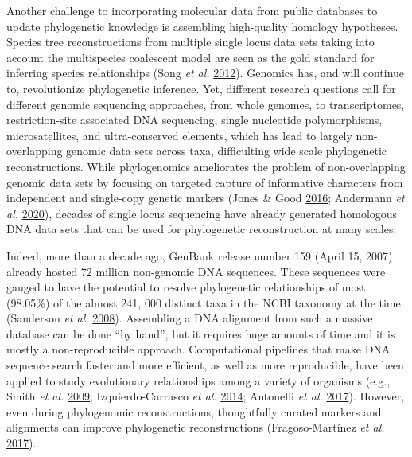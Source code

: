 \documentclass[]{article}
\begin{document}
Another challenge to incorporating molecular data from public databases to update phylogenetic knowledge is assembling high-quality homology hypotheses.
Species tree reconstructions from multiple single locus data sets taking into account the multispecies coalescent model are seen as the gold standard for inferring species relationships (Song \emph{et al.} \protect\hyperlink{ref-song2012resolving}{2012}).
Genomics has, and will continue to, revolutionize phylogenetic inference.
Yet, different research questions call for different genomic sequencing approaches, from whole genomes, to transcriptomes, restriction-site associated DNA sequencing, single nucleotide polymorphisms, microsatellites, and ultra-conserved elements, which has lead to largely non-overlapping genomic data sets across taxa, difficulting wide scale phylogenetic reconstructions.
While phylogenomics ameliorates the problem of non-overlapping genomic data sets by focusing on targeted capture of informative characters from independent and single-copy genetic markers (Jones \& Good \protect\hyperlink{ref-jones2016targeted}{2016}; Andermann \emph{et al.} \protect\hyperlink{ref-andermann2020guide}{2020}), decades of single locus sequencing have already generated homologous DNA data sets that can be used for phylogenetic reconstruction at many scales.

Indeed, more than a decade ago, GenBank release number 159 (April 15, 2007) already hosted 72 million non-genomic DNA sequences. These sequences were gauged to have the potential to resolve phylogenetic relationships of most (98.05\%) of the almost 241, 000 distinct taxa in the NCBI taxonomy at the time (Sanderson \emph{et al.} \protect\hyperlink{ref-sanderson2008phylota}{2008}). Assembling a DNA alignment from such a massive database can be done ``by hand'', but it requires huge amounts of time and it is mostly a non-reproducible approach. Computational pipelines that make DNA sequence search faster and more efficient, as well as more reproducible, have been applied to study evolutionary relationships among a variety of organisms (e.g., Smith \emph{et al.} \protect\hyperlink{ref-smith2009mega}{2009}; Izquierdo-Carrasco \emph{et al.} \protect\hyperlink{ref-izquierdo2014pumper}{2014}; Antonelli \emph{et al.} \protect\hyperlink{ref-antonelli2017toward}{2017}).
However, even during phylogenomic reconstructions, thoughtfully curated markers and alignments can improve phylogenetic reconstructions (Fragoso-Martínez \emph{et al.} \protect\hyperlink{ref-fragoso2017pilot}{2017}).
\end{document}
